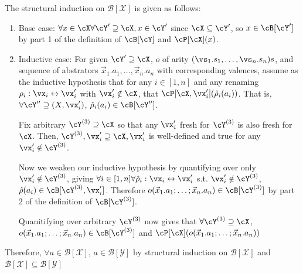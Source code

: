 \documentclass[11pt]{book}
\begin{document}
The structural induction on $\mathcal{B[X]}$ is given as follows:
\begin{enumerate}
    \item Base case: $\forall x \in \cX \forall \cY' \supseteq \cX, x \in \cY'$ since $\cX \subseteq \cY'$, so $x \in \cB[\cY']$ by part 1 of the definition of $\cB[\cY]$ and $\cP[\cX](x)$.
    \item Inductive case: For given $\cY' \supseteq \cX$, $o$ of arity $(\vs_1.s_1,\dots,\vs_n.s_n)s$, and sequence of abstrators $\vec{x}_1.a_1,\dots,\vec{x}_n.a_n$ with corresponding valences, assume as the inductive hypothesis that for any $i \in [1,n]$ and any renaming $\rho_i: \vx_i \leftrightarrow \vx'_i$ with $\vx'_i \notin \cX$, that $\cP[\cX,\vx'_i](\hat{\rho}_i(a_i))$. That is, $\forall \cY'' \supseteq (X, \vx'_i)$, $\hat{\rho}_i(a_i) \in \cB[\cY'']$. 
    
    Fix arbitrary $\cY^{(3)} \supseteq \cX$ so that any $\vx'_i$ fresh for $\cY^{(3)}$ is also fresh for $\cX$. Then, $\cY^{(3)}, \vx'_i \supseteq \cX, \vx'_i$ is well-defined and true for any $\vx'_i \notin \cY^{(3)}$.
    
    Now we weaken our inductive hypothesis by quantifying over only $\vx'_i \notin \cY^{(3)}$, giving $\forall i \in [1,n] \forall \hat{\rho}_i: \vx_i \leftrightarrow \vx'_i$ s.t. $\vx'_i \notin \cY^{(3)}$, $\hat{\rho}(a_i) \in \cB[\cY^{(3)},\vx'_i]$. Therefore $o(\vec{x}_1.a_1;\dots;\vec{x}_n.a_n) \in \cB[\cY^{(3)}]$ by part 2 of the definition of $\cB[\cY^{(3)}]$. 
    
    Quanitifying over arbitrary $\cY^{(3)}$ now gives that $\forall \cY^{(3)} \supseteq \cX$, $o(\vec{x}_1.a_1;\dots;\vec{x}_n.a_n) \in \cB[\cY^{(3)}]$ and $\cP[\cX](o(\vec{x}_1.a_1;\dots;\vec{x}_n.a_n))$
\end{enumerate}

Therefore, $\forall a \in \mathcal{B[X]}$, $a \in \mathcal{B[Y]}$ by structural induction on $\mathcal{B[X]}$ and $\mathcal{B[X]} \subseteq \mathcal{B[Y]}$
\end{document}

